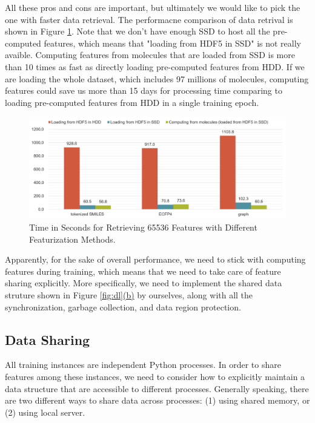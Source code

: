 \documentclass[conference]{IEEEtran}
\begin{document}
All these pros and cons are important, but ultimately we would like to pick the one with faster data retrieval. The performacne comparison of data retrival is shown in Figure \ref{fig:sp}. 
Note that we don't have enough SSD to host all the pre-computed features, which means that "loading from HDF5 in SSD" is not really avaible. 
Computing features from molecules that are loaded from SSD is more than 10 times as fast as directly loading pre-computed features from HDD. 
If we are loading the whole dataset, which includes 97 millions of molecules, computing features could save us more than 15 days for processing time comparing to loading pre-computed features from HDD in a single training epoch. 

\begin{figure}[!htb] 
	\includegraphics[width=\linewidth]{speed.png}
	\caption{\small Time in Seconds for Retrieving 65536 Features with Different Featurization Methods. }
	\label{fig:sp}
\end{figure}

Apparently, for the sake of overall performance, we need to stick with computing features during training, which means that we need to take care of feature sharing explicitly. 
More specifically, we need to implement the shared data struture shown in Figure \ref{fig:dl}\hyperref[dl_b]{(b)} by ourselves, along with all the synchronization, garbage collection, and data region protection. 

\subsection{Data Sharing} \label{subsec_ds}

All training instances are independent Python processes. 
In order to share features among these instances, we need to consider how to explicitly maintain a data structure that are accessible to different processes.
Generally speaking, there are two different ways to share data across processes: (1) using shared memory, or (2) using local server. 
\end{document}
